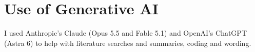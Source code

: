 \section*{Use of Generative AI}
I used Anthropic's Claude (Opus 5.5 and Fable 5.1) and OpenAI's ChatGPT
(Astra 6) to help with literature searches and summaries, coding and
wording.
